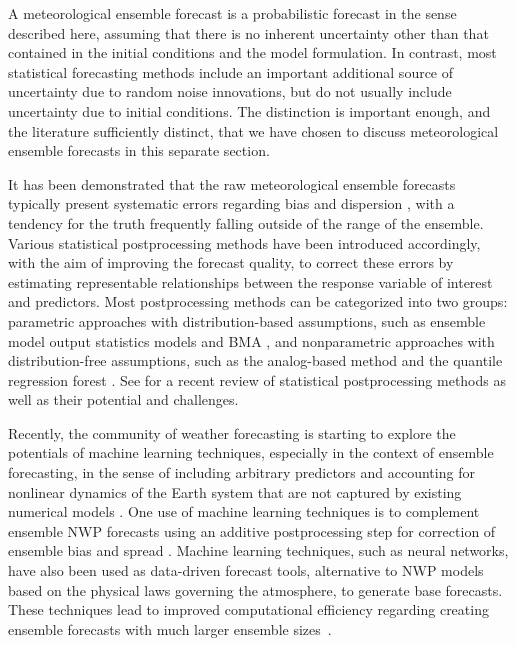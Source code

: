 \documentclass[a4paper,11pt]{article}
\begin{document}
A meteorological ensemble forecast is a probabilistic forecast in the sense described here, assuming that there is no inherent uncertainty other than that contained in the initial conditions and the model formulation. In contrast, most statistical forecasting methods include an important additional source of uncertainty due to random noise innovations, but do not usually include uncertainty due to initial conditions. The distinction is important enough, and the literature sufficiently distinct, that we have chosen to discuss meteorological ensemble forecasts in this separate section.

It has been demonstrated that the raw meteorological ensemble forecasts typically present systematic errors regarding bias \citep{Atger2003-lx,Mass2003-bc} and dispersion \citep{Buizza2005-wf,Sloughter2010-ae}, with a tendency for the truth frequently falling outside of the range of the ensemble. Various statistical postprocessing methods have been introduced accordingly, with the aim of improving the forecast quality, to correct these errors by estimating representable relationships between the response variable of interest and predictors. Most postprocessing methods can be categorized into two groups: parametric approaches with distribution-based assumptions, such as ensemble model output statistics \citep[EMOS,][]{Gneiting2005-ua} models and BMA \citep{Raftery2005-vu}, and nonparametric approaches with distribution-free assumptions, such as the analog-based method \citep[e.g.,][]{Delle_Monache2013-os} and the quantile regression forest \citep{Taillardat2019-ni}. See \citet{Vannitsem2021-bg} for a recent review of statistical postprocessing methods as well as their potential and challenges.

Recently, the community of weather forecasting is starting to explore the potentials of machine learning techniques, especially in the context of ensemble forecasting, in the sense of including arbitrary predictors and accounting for nonlinear dynamics of the Earth system that are not captured by existing numerical models \citep{Dueben2021-fe}. One use of machine learning techniques is to complement ensemble NWP \citep[numerical weather prediction, see, e.g.,][for a summary of its revolution]{Bauer2015-dg,Benjamin2019-zp} forecasts using an additive postprocessing step for correction of ensemble bias and spread \citep{Rasp2018-zu,Scher2018-dm,Gronquist2021-no}. Machine learning techniques, such as neural networks, have also been used as data-driven forecast tools, alternative to NWP models based on the physical laws governing the atmosphere, to generate base forecasts. These techniques lead to improved computational efficiency regarding creating ensemble forecasts with much larger ensemble sizes~\citep{Dueben2018-ln,Scher2018-of,Rasp2021-az,Scher2021-ee}.
\end{document}
